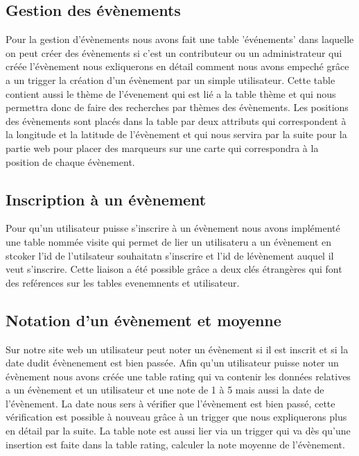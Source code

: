 \documentclass[french]{article}
\begin{document}
    \subsection{Gestion des évènements}
        Pour la gestion d'évènements nous avons fait une table 'événements' dans laquelle on peut créer des évènements si c'est un contributeur ou un administrateur qui créée l'évènement nous exliquerons en détail comment nous avons empeché grâce a un trigger la création d'un évènement par un simple utilisateur.
        Cette table contient aussi le thème de l'évenement qui est lié a la table thème et qui nous permettra donc de faire des recherches par thèmes des évènements.
        Les positions des évènements sont placés dans la table par deux attributs qui correspondent à la longitude et la latitude de l'évènement et qui nous servira par la suite pour la partie web pour placer des marqueurs sur une carte qui correspondra à la position de chaque évènement.
    \subsection{Inscription à un évènement}
        Pour qu'un utilisateur puisse s'inscrire à un évènement nous avons implémenté une table nommée visite qui permet de lier un utilisateru a un évènement en stcoker l'id de l'utilsateur souhaitatn s'inscrire et l'id de lévènement auquel il veut s'inscrire.
        Cette liaison a été possible grâce a deux clés étrangères qui font des reférences sur les tables evenemnents et utilisateur.
        \subsection{Notation d'un évènement et moyenne}
        Sur notre site web un utilisateur peut noter un évènement si il est inscrit et si la date dudit évènenement est bien passée.
        Afin qu'un utilisateur puisse noter un évènement nous avons créée une table rating qui va contenir les données relatives a un évènement et un utilisateur et une note de 1 à 5 mais aussi la date de l'évènement.
        La date nous sers à vérifier que l'évènement est bien passé, cette vérification est possible à nouveau grâce à un trigger que nous expliquerons plus en détail par la suite.
        La table note est aussi lier via un trigger qui va dès qu'une insertion est faite dans la table rating, calculer la note moyenne de l'évènement.\\\\\\\\ 
\end{document}
